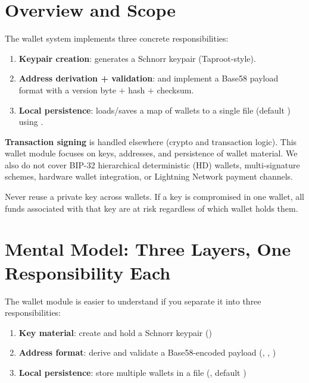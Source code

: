 \section{Overview and Scope}
\label{sec:wallet-overview}

The wallet system implements three concrete responsibilities:

\begin{enumerate}
  \item \textbf{Keypair creation}:  generates a Schnorr keypair (Taproot-style).
  \item \textbf{Address derivation + validation}:  and  implement a Base58 payload format with a version byte $+$ hash $+$ checksum.
  \item \textbf{Local persistence}:  loads/saves a map of wallets to a single file (default ) using .
\end{enumerate}

\begin{warnbox}
\textbf{Transaction signing} is handled elsewhere (crypto and transaction logic). This wallet module focuses on keys, addresses, and persistence of wallet material. We also do not cover BIP-32 hierarchical deterministic (HD) wallets, multi-signature schemes, hardware wallet integration, or Lightning Network payment channels.
\end{warnbox}

\begin{warnbox}
Never reuse a private key across wallets. If a key is compromised in one wallet, all funds associated with that key are at risk regardless of which wallet holds them.
\end{warnbox}

\section{Mental Model: Three Layers, One Responsibility Each}
\label{sec:wallet-mental-model}

The wallet module is easier to understand if you separate it into three responsibilities:

\begin{enumerate}
  \item \textbf{Key material}: create and hold a Schnorr keypair ()
  \item \textbf{Address format}: derive and validate a Base58-encoded payload (, , )
  \item \textbf{Local persistence}: store multiple wallets in a file (, default )
\end{enumerate}

